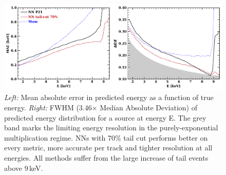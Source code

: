 \begin{figure}[t]
\centering
\includegraphics[width=1.0\textwidth]{figures/fig7.pdf}
\caption{\textit{Left:} Mean absolute error in predicted energy as a function of true energy. \textit{Right:} FWHM (3.46$\times$ Median Absolute Deviation) of predicted energy distribution for a source at energy E. The grey band marks the limiting energy resolution in the purely-exponential multiplication regime. NNs with 70\% tail cut performs better on every metric, more accurate per track and tighter resolution at all energies. All methods suffer from the large increase of tail events above 9\,keV.}
\label{fig:energy_mse}
\end{figure}
